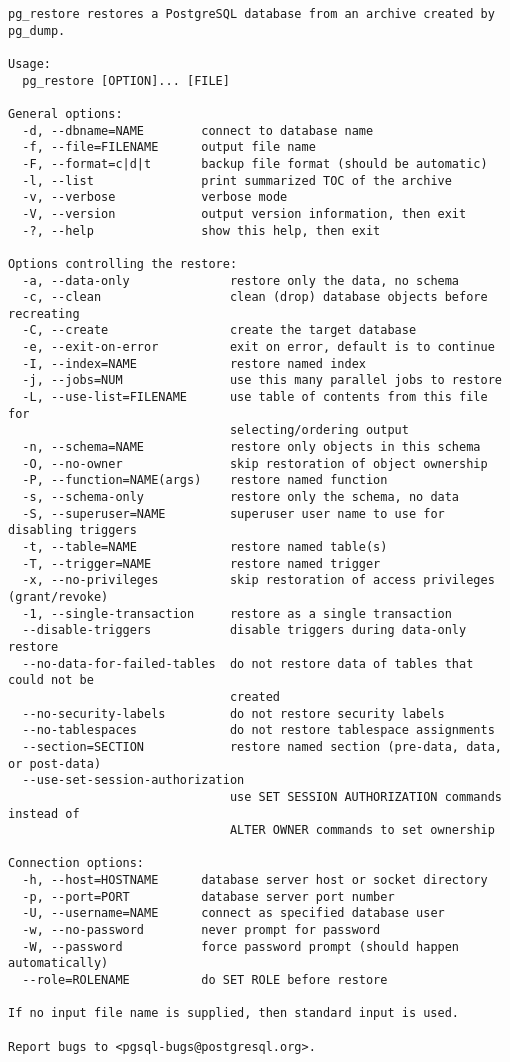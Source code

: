 \begin{verbatim}
pg_restore restores a PostgreSQL database from an archive created by pg_dump.

Usage:
  pg_restore [OPTION]... [FILE]

General options:
  -d, --dbname=NAME        connect to database name
  -f, --file=FILENAME      output file name
  -F, --format=c|d|t       backup file format (should be automatic)
  -l, --list               print summarized TOC of the archive
  -v, --verbose            verbose mode
  -V, --version            output version information, then exit
  -?, --help               show this help, then exit

Options controlling the restore:
  -a, --data-only              restore only the data, no schema
  -c, --clean                  clean (drop) database objects before recreating
  -C, --create                 create the target database
  -e, --exit-on-error          exit on error, default is to continue
  -I, --index=NAME             restore named index
  -j, --jobs=NUM               use this many parallel jobs to restore
  -L, --use-list=FILENAME      use table of contents from this file for
                               selecting/ordering output
  -n, --schema=NAME            restore only objects in this schema
  -O, --no-owner               skip restoration of object ownership
  -P, --function=NAME(args)    restore named function
  -s, --schema-only            restore only the schema, no data
  -S, --superuser=NAME         superuser user name to use for disabling triggers
  -t, --table=NAME             restore named table(s)
  -T, --trigger=NAME           restore named trigger
  -x, --no-privileges          skip restoration of access privileges (grant/revoke)
  -1, --single-transaction     restore as a single transaction
  --disable-triggers           disable triggers during data-only restore
  --no-data-for-failed-tables  do not restore data of tables that could not be
                               created
  --no-security-labels         do not restore security labels
  --no-tablespaces             do not restore tablespace assignments
  --section=SECTION            restore named section (pre-data, data, or post-data)
  --use-set-session-authorization
                               use SET SESSION AUTHORIZATION commands instead of
                               ALTER OWNER commands to set ownership

Connection options:
  -h, --host=HOSTNAME      database server host or socket directory
  -p, --port=PORT          database server port number
  -U, --username=NAME      connect as specified database user
  -w, --no-password        never prompt for password
  -W, --password           force password prompt (should happen automatically)
  --role=ROLENAME          do SET ROLE before restore

If no input file name is supplied, then standard input is used.

Report bugs to <pgsql-bugs@postgresql.org>.
 
\end{verbatim}


